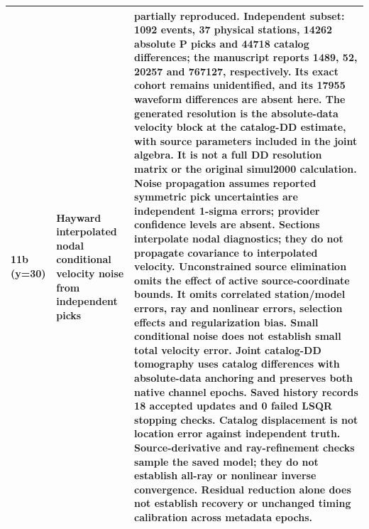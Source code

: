 \begin{longtable}{>{\raggedright\arraybackslash}p{}>{\raggedright\arraybackslash}p{}>{\raggedright\arraybackslash}p{}}
11b (y=30) & Hayward interpolated nodal conditional velocity noise from independent picks & partially reproduced. Independent subset: 1092 events, 37 physical stations, 14262 absolute P picks and 44718 catalog differences; the manuscript reports 1489, 52, 20257 and 767127, respectively. Its exact cohort remains unidentified, and its 17955 waveform differences are absent here. The generated resolution is the absolute-data velocity block at the catalog-DD estimate, with source parameters included in the joint algebra. It is not a full DD resolution matrix or the original simul2000 calculation. Noise propagation assumes reported symmetric pick uncertainties are independent 1-sigma errors; provider confidence levels are absent. Sections interpolate nodal diagnostics; they do not propagate covariance to interpolated velocity. Unconstrained source elimination omits the effect of active source-coordinate bounds. It omits correlated station/model errors, ray and nonlinear errors, selection effects and regularization bias. Small conditional noise does not establish small total velocity error. Joint catalog-DD tomography uses catalog differences with absolute-data anchoring and preserves both native channel epochs. Saved history records 18 accepted updates and 0 failed LSQR stopping checks. Catalog displacement is not location error against independent truth. Source-derivative and ray-refinement checks sample the saved model; they do not establish all-ray or nonlinear inverse convergence. Residual reduction alone does not establish recovery or unchanged timing calibration across metadata epochs.\\
\bottomrule\end{longtable}
